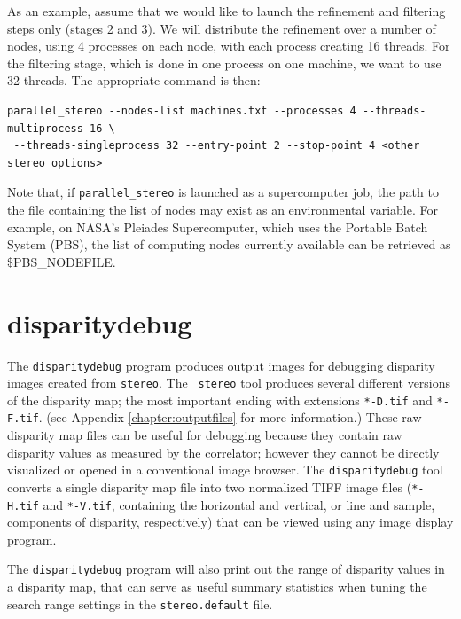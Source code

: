 As an example, assume that we would like to launch the refinement and
filtering steps only (stages 2 and 3). We will distribute the
refinement over a number of nodes, using 4 processes on each node, with
each process creating 16 threads. For the filtering stage, which is done
in one process on one machine, we want to use 32 threads. The
appropriate command is then:

\begin{verbatim}
parallel_stereo --nodes-list machines.txt --processes 4 --threads-multiprocess 16 \
 --threads-singleprocess 32 --entry-point 2 --stop-point 4 <other stereo options>
\end{verbatim}

Note that, if \texttt{parallel\_stereo} is launched as a supercomputer
job, the path to the file containing the list of nodes may exist as an environmental
variable. For example, on NASA's Pleiades Supercomputer, which uses the
Portable Batch System (PBS), the list of computing nodes currently
available can be retrieved as \$PBS\_NODEFILE.

\section{disparitydebug}
\label{disparitydebug}

The \texttt{disparitydebug} program produces output images for
debugging disparity images created from \verb#stereo#. The {\tt
stereo} tool produces several different versions of the disparity
map; the most important ending with extensions \verb#*-D.tif# and
\verb#*-F.tif#. (see Appendix \ref{chapter:outputfiles} for more
information.)  These raw disparity map files can be useful for
debugging because they contain raw disparity values as measured by
the correlator; however they cannot be directly visualized or opened
in a conventional image browser.  The \verb#disparitydebug# tool
converts a single disparity map file into two normalized TIFF image
files (\verb#*-H.tif# and \verb#*-V.tif#, containing the horizontal
and vertical, or line and sample, components of disparity, respectively)
that can be viewed using any image display program.

The {\tt disparitydebug} program will also print out the range of
disparity values in a disparity map, that can serve as useful summary
statistics when tuning the search range settings in the
{\tt stereo.default} file.

